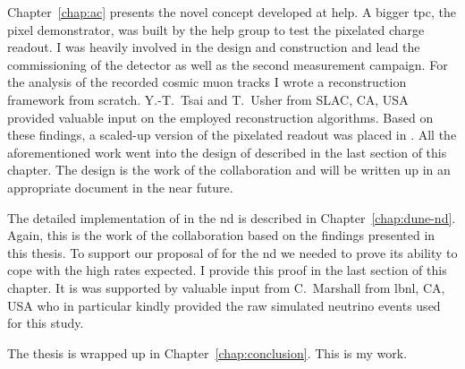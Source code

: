 Chapter~\ref{chap:ac} presents the novel \AC{} \lartpc{} concept developed at \gls{help}.
A bigger \gls{tpc}, the pixel demonstrator, was built by the \gls{help} \lar{} group to test the pixelated charge readout.
I was heavily involved in the design and construction and lead the commissioning of the detector as well as the second measurement campaign.
For the analysis of the recorded cosmic muon tracks I wrote a reconstruction framework from scratch.
Y.-T.\ Tsai and T.\ Usher from SLAC, CA, USA provided valuable input on the employed reconstruction algorithms.
Based on these findings, a scaled-up version of the pixelated readout was placed in \lariat{}.
All the aforementioned work went into the design of \AC{} described in the last section of this chapter.
The design is the work of the \AC{} collaboration and will be written up in an appropriate document in the near future.

The detailed implementation of \AC{} in the \dune{} \gls{nd} is described in Chapter~\ref{chap:dune-nd}.
Again, this is the work of the \AC{} collaboration based on the findings presented in this thesis.
To support our proposal of \AC{} for the \dune{} \gls{nd} we needed to prove its ability to cope with the high rates expected.
I provide this proof in the last section of this chapter.
It is was supported by valuable input from C.\ Marshall from \gls{lbnl}, CA, USA who in particular kindly provided the raw simulated neutrino events used for this study.

The thesis is wrapped up in Chapter~\ref{chap:conclusion}.
This is my work.